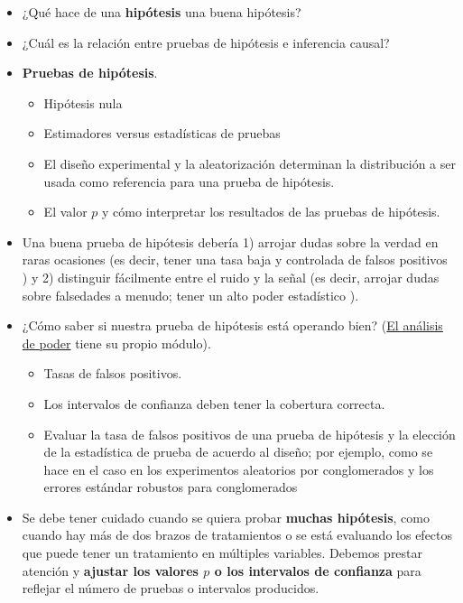 \documentclass[12pt,spanish,]{book}
\begin{document}
\begin{itemize}
\item
  ¿Qué hace de una \textbf{hipótesis} una buena hipótesis?
\item
  ¿Cuál es la relación entre pruebas de hipótesis e inferencia causal?
\item
  \textbf{Pruebas de hipótesis}.

  \begin{itemize}
  \item
    Hipótesis nula
  \item
    Estimadores versus estadísticas de pruebas
  \item
    El diseño experimental y la aleatorización determinan la distribución a ser usada como referencia para una prueba de hipótesis.
  \item
    El valor \(p\) y cómo interpretar los resultados de las pruebas de hipótesis.
  \end{itemize}
\item
  Una buena prueba de hipótesis debería 1) arrojar dudas sobre la verdad en raras ocasiones (es decir, tener una tasa baja y controlada de falsos positivos ) y 2) distinguir fácilmente entre el ruido y la señal (es decir, arrojar dudas sobre falsedades a menudo; tener un alto poder estadístico ).
\item
  ¿Cómo saber si nuestra prueba de hipótesis está operando bien? (\href{poder-estadístico-y-diagnosticandos-del-diseño.html}{El análisis de poder} tiene su propio módulo).

  \begin{itemize}
  \item
    Tasas de falsos positivos.
  \item
    Los intervalos de confianza deben tener la cobertura correcta.
  \item
    Evaluar la tasa de falsos positivos de una prueba de hipótesis y la elección de la estadística de prueba de acuerdo al diseño; por ejemplo, como se hace en el caso en los experimentos aleatorios por conglomerados y los errores estándar robustos para conglomerados
  \end{itemize}
\item
  Se debe tener cuidado cuando se quiera probar \textbf{muchas hipótesis}, como cuando hay más de dos brazos de tratamientos o se está evaluando los efectos que puede tener un tratamiento en múltiples variables. Debemos prestar atención y \textbf{ajustar los valores \(p\) o los intervalos de confianza} para reflejar el número de pruebas o intervalos producidos.
\end{itemize}
\end{document}
